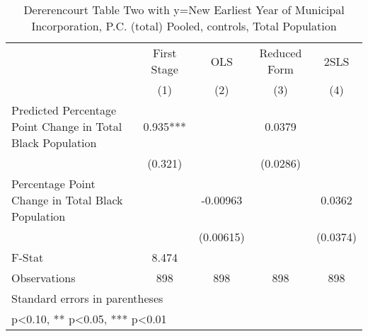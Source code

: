 \begin{table}[htbp]\centering
\def\sym#1{\ifmmode^{#1}\else\(^{#1}\)\fi}
\caption{Dererencourt Table Two with y=New Earliest Year of Municipal Incorporation, P.C. (total)  Pooled,  controls, Total Population}
\begin{tabular}{l*{4}{c}}
\toprule
                    & First Stage   &         OLS   &Reduced Form   &        2SLS   \\
                    &\multicolumn{1}{c}{(1)}   &\multicolumn{1}{c}{(2)}   &\multicolumn{1}{c}{(3)}   &\multicolumn{1}{c}{(4)}   \\
\midrule
Predicted Percentage Point Change in Total Black Population&       0.935***&               &      0.0379   &               \\
                    &     (0.321)   &               &    (0.0286)   &               \\
\addlinespace
Percentage Point Change in Total Black Population&               &    -0.00963   &               &      0.0362   \\
                    &               &   (0.00615)   &               &    (0.0374)   \\
\midrule
F-Stat              &       8.474   &               &               &               \\
Observations        &         898   &         898   &         898   &         898   \\
\bottomrule
\multicolumn{5}{l}{\footnotesize Standard errors in parentheses}\\
\multicolumn{5}{l}{\footnotesize * p<0.10, ** p<0.05, *** p<0.01}\\
\end{tabular}
\end{table}
